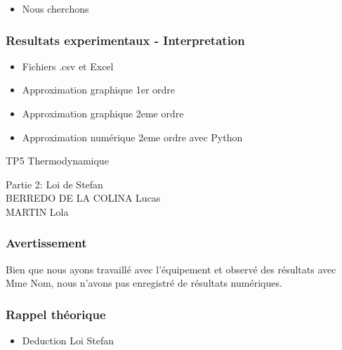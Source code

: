 \documentclass{beamer}
\begin{document}
\begin{frame}


\end{frame}




\begin{frame}
\begin{itemize}
	\item{Nous cherchons}
\end{itemize}
\end{frame}



\begin{frame}
\frametitle{Resultats experimentaux - Interpretation}

\begin{itemize}
	\item{Fichiers .csv et Excel}
	\item{Approximation graphique 1er ordre}
	\item{Approximation graphique 2eme ordre}
	\item{Approximation numérique 2eme ordre avec Python}

\end{itemize}
\end{frame}





\begin{frame}

\Huge{TP5 Thermodynamique}

\Large{Partie 2: Loi de Stefan}
\\[2em]
\large{BERREDO DE LA COLINA Lucas\\ MARTIN Lola}

\end{frame}





\begin{frame}
\frametitle{Avertissement}
Bien que nous ayons travaillé avec l'équipement et observé des résultats avec {\color{red} Mme Nom}, nous n'avons pas enregistré de résultats numériques.
\end{frame}





\begin{frame}
\frametitle{Rappel théorique}

\begin{itemize}
	\item{Deduction Loi Stefan}

\end{itemize}

\end{frame}
\end{document}
